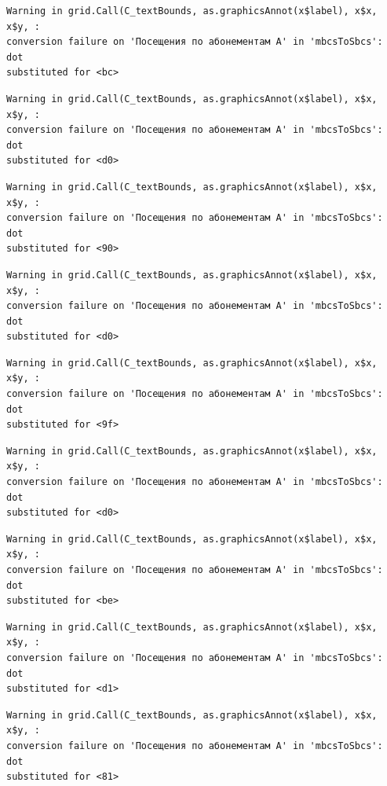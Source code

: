 \documentclass[
  letterpaper,
  DIV=11,
  numbers=noendperiod]{scrartcl}
\begin{document}
\begin{verbatim}
Warning in grid.Call(C_textBounds, as.graphicsAnnot(x$label), x$x, x$y, :
conversion failure on 'Посещения по абонементам А' in 'mbcsToSbcs': dot
substituted for <bc>
\end{verbatim}

\begin{verbatim}
Warning in grid.Call(C_textBounds, as.graphicsAnnot(x$label), x$x, x$y, :
conversion failure on 'Посещения по абонементам А' in 'mbcsToSbcs': dot
substituted for <d0>
\end{verbatim}

\begin{verbatim}
Warning in grid.Call(C_textBounds, as.graphicsAnnot(x$label), x$x, x$y, :
conversion failure on 'Посещения по абонементам А' in 'mbcsToSbcs': dot
substituted for <90>
\end{verbatim}

\begin{verbatim}
Warning in grid.Call(C_textBounds, as.graphicsAnnot(x$label), x$x, x$y, :
conversion failure on 'Посещения по абонементам А' in 'mbcsToSbcs': dot
substituted for <d0>
\end{verbatim}

\begin{verbatim}
Warning in grid.Call(C_textBounds, as.graphicsAnnot(x$label), x$x, x$y, :
conversion failure on 'Посещения по абонементам А' in 'mbcsToSbcs': dot
substituted for <9f>
\end{verbatim}

\begin{verbatim}
Warning in grid.Call(C_textBounds, as.graphicsAnnot(x$label), x$x, x$y, :
conversion failure on 'Посещения по абонементам А' in 'mbcsToSbcs': dot
substituted for <d0>
\end{verbatim}

\begin{verbatim}
Warning in grid.Call(C_textBounds, as.graphicsAnnot(x$label), x$x, x$y, :
conversion failure on 'Посещения по абонементам А' in 'mbcsToSbcs': dot
substituted for <be>
\end{verbatim}

\begin{verbatim}
Warning in grid.Call(C_textBounds, as.graphicsAnnot(x$label), x$x, x$y, :
conversion failure on 'Посещения по абонементам А' in 'mbcsToSbcs': dot
substituted for <d1>
\end{verbatim}

\begin{verbatim}
Warning in grid.Call(C_textBounds, as.graphicsAnnot(x$label), x$x, x$y, :
conversion failure on 'Посещения по абонементам А' in 'mbcsToSbcs': dot
substituted for <81>
\end{verbatim}
\end{document}
